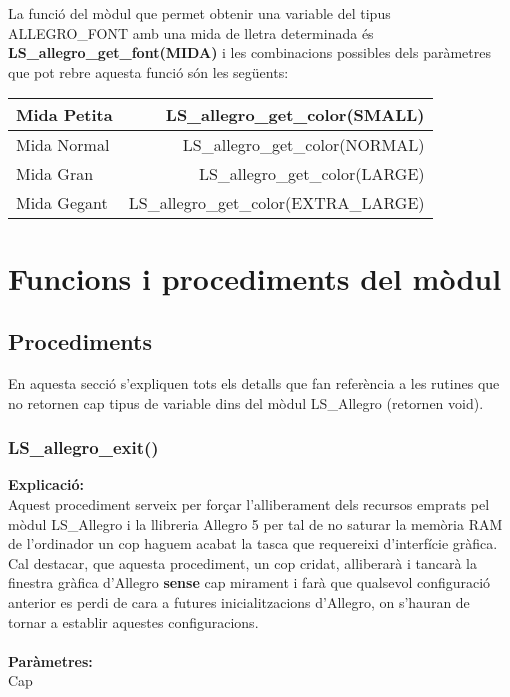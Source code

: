 \documentclass[11pt]{article}
\begin{document}
\pagebreak
\noindent La funció del mòdul que permet obtenir una variable del tipus ALLEGRO\_FONT amb una mida de lletra determinada és \textbf{LS\_allegro\_get\_font(MIDA)} i les combinacions possibles dels paràmetres que pot rebre aquesta funció són les següents:

\begin{center}
\begin{tabular}{|l|r|}
\hline
Mida Petita & LS\_allegro\_get\_color(SMALL) \\
\hline
Mida Normal & LS\_allegro\_get\_color(NORMAL) \\
\hline
Mida Gran & LS\_allegro\_get\_color(LARGE) \\
\hline
Mida Gegant & LS\_allegro\_get\_color(EXTRA\_LARGE) \\
\hline
\end{tabular}
\end{center}

\section{Funcions i procediments del mòdul}

\subsection{Procediments}
En aquesta secció s'expliquen tots els detalls que fan referència a les rutines que no retornen cap tipus de variable dins del mòdul LS\_Allegro (retornen void).

\subsubsection{LS\_allegro\_exit()}

\textbf{Explicació:}\\
Aquest procediment serveix per forçar l'alliberament dels recursos emprats pel mòdul LS\_Allegro i la llibreria Allegro 5 per tal de no saturar la memòria RAM de l'ordinador un cop haguem acabat la tasca que requereixi d'interfície gràfica. Cal destacar, que aquesta procediment, un cop cridat, alliberarà i tancarà la finestra gràfica d'Allegro \textbf{sense} cap mirament i farà que qualsevol configuració anterior es perdi de cara a futures inicialitzacions d'Allegro, on s'hauran de tornar a establir aquestes configuracions.\\\\
\noindent \textbf{Paràmetres:}\\ Cap
\end{document}
